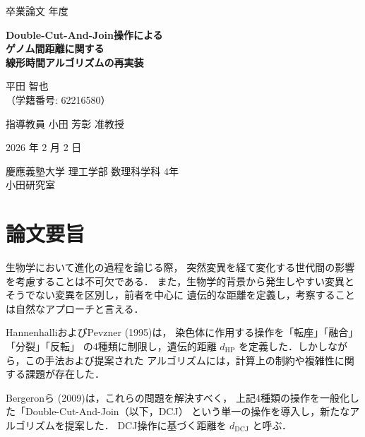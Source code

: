 \documentclass[paper=a4,fontsize=11pt,report,oneside]{jlreq}
\begin{document}
\begin{titlepage}
    \centering
    \vspace*{10mm}
    {\Large 卒業論文  年度} \\

    \vspace{40mm}

    {\huge \bfseries Double-Cut-And-Join操作による\\ゲノム間距離に関する\\線形時間アルゴリズムの再実装} \\

    \vspace{50mm}

    {\Large 平田 智也} \\
    {\large（学籍番号: 62216580）} \\

    \vspace{20mm}

    {\Large 指導教員 \quad 小田 芳彰 准教授} \\

    \vfill

    {\Large 2026 年 2 月 2 日} \\

    \vspace{10mm}

    {\Large 慶應義塾大学 理工学部 数理科学科 4年}\\
    {\Large 小田研究室}
\end{titlepage}

\tableofcontents

\newpage
\chapter*{論文要旨}

生物学において進化の過程を論じる際，
突然変異を経て変化する世代間の影響を考慮することは不可欠である．
また，生物学的背景から発生しやすい変異と
そうでない変異を区別し，前者を中心に
遺伝的な距離を定義し，考察することは自然なアプローチと言える．

HannenhalliおよびPevzner (1995)\cite{hp1995}は，
染色体に作用する操作を「転座」「融合」「分裂」「反転」
の4種類に制限し，遺伝的距離 $d_{\mathrm{HP}}$
を定義した．しかしながら，この手法および提案された
アルゴリズムには，計算上の制約や複雑性に関する課題が存在した．

Bergeronら (2009)\cite{bergeron2009}は，これらの問題を解決すべく，
上記4種類の操作を一般化した「Double-Cut-And-Join（以下，DCJ）
という単一の操作を導入し，新たなアルゴリズムを提案した．
DCJ操作に基づく距離を $d_{\mathrm{DCJ}}$ と呼ぶ．
\end{document}
